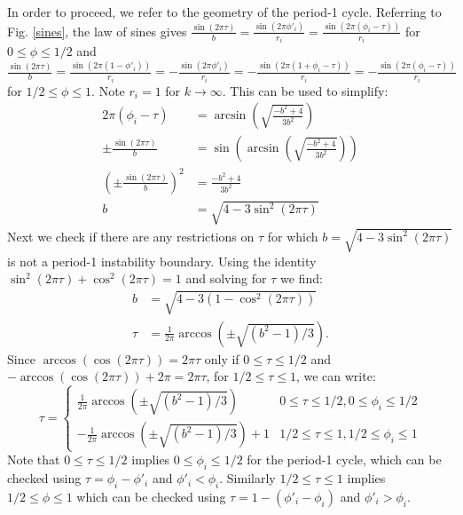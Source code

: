\indent In order to proceed, we refer to the geometry of the period-1 cycle. Referring to Fig. \ref{sines}, the law of sines gives $\frac{\sin(2\pi \tau)}{b}=\frac{\sin(2\pi \phi'_i)}{r_i}=\frac{\sin(2\pi (\phi_i -\tau))}{r_i}$ for $0\leq \phi \leq1/2$ and $\frac{\sin(2\pi \tau)}{b}=\frac{\sin(2\pi (1-\phi'_i))}{r_i}=-\frac{\sin(2\pi \phi'_i)}{r_i}=-\frac{\sin(2\pi (1+\phi_i-\tau))}{r_i}=-\frac{\sin(2\pi (\phi_i-\tau))}{r_i}$ for $1/2\leq \phi \leq1$. Note $r_i=1$ for $k\rightarrow \infty$. This can be used to simplify:
\begin{align}
    2\pi(\phi_i - \tau) &= \arcsin(\sqrt{\frac{-b^2+4}{3b^2}}) \nonumber \\
    \pm\frac{\sin(2\pi \tau)}{b} &= \sin(\arcsin(\sqrt{\frac{-b^2+4}{3b^2}}))\nonumber \\
    (\pm\frac{\sin(2\pi \tau)}{b})^2 &= \frac{-b^2+4}{3b^2} \nonumber \\
    b &= \sqrt{4-3\sin^2(2\pi\tau)} 
    \label{eq:bound2}
\end{align}
Next we check if there are any restrictions on $\tau$ for which $b = \sqrt{4-3\sin^2(2\pi\tau)}$ is not a period-1 instability boundary. Using the identity $\sin^2(2\pi\tau) + \cos^2(2\pi\tau) = 1$ and solving for $\tau$ we find:
\begin{align}
    b &= \sqrt{4-3(1-\cos^2(2\pi\tau))}\\
    \tau &= \frac{1}{2\pi}\arccos(\pm\sqrt{(b^2 - 1)/3}).
\end{align}
Since $\arccos(\cos(2\pi \tau)) = 2\pi \tau$ only if $0 \leq \tau \leq 1/2$ and $-\arccos(\cos(2\pi \tau)) +2\pi= 2\pi \tau$, for $1/2 \leq \tau \leq 1$, we can write:
\begin{equation} 
\tau =
\begin{cases}
        \frac{1}{2\pi}\arccos(\pm\sqrt{(b^2 - 1)/3}) & 0 \leq \tau \leq 1/2, 0 \leq \phi_i \leq 1/2 \\
       -\frac{1}{2\pi}\arccos(\pm\sqrt{(b^2 - 1)/3}) + 1 & 1/2 \leq \tau \leq 1, 1/2 \leq \phi_i \leq 1
    \end{cases}
\end{equation} Note that $0 \leq \tau \leq 1/2$ implies $0 \leq \phi_i \leq 1/2$ for the period-1 cycle, which can be checked using $\tau = \phi_i - \phi'_i$ and $\phi'_i<\phi_i$. Similarly $1/2 \leq \tau \leq 1$ implies $1/2 \leq \phi \leq 1$ which can be checked using $\tau = 1-(\phi'_i - \phi_i)$ and $\phi'_i>\phi_i$.\\

